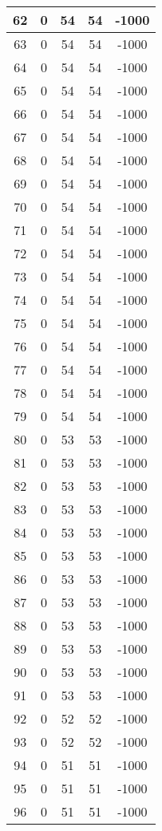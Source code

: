 \documentclass[letterpaper, 12pt]{article}
\begin{document}
\begin{longtable}{|c|c|c|c|c|}
\hline
62 & 0 & 54 & 54 & -1000 \\
\hline
63 & 0 & 54 & 54 & -1000 \\
\hline
64 & 0 & 54 & 54 & -1000 \\
\hline
65 & 0 & 54 & 54 & -1000 \\
\hline
66 & 0 & 54 & 54 & -1000 \\
\hline
67 & 0 & 54 & 54 & -1000 \\
\hline
68 & 0 & 54 & 54 & -1000 \\
\hline
69 & 0 & 54 & 54 & -1000 \\
\hline
70 & 0 & 54 & 54 & -1000 \\
\hline
71 & 0 & 54 & 54 & -1000 \\
\hline
72 & 0 & 54 & 54 & -1000 \\
\hline
73 & 0 & 54 & 54 & -1000 \\
\hline
74 & 0 & 54 & 54 & -1000 \\
\hline
75 & 0 & 54 & 54 & -1000 \\
\hline
76 & 0 & 54 & 54 & -1000 \\
\hline
77 & 0 & 54 & 54 & -1000 \\
\hline
78 & 0 & 54 & 54 & -1000 \\
\hline
79 & 0 & 54 & 54 & -1000 \\
\hline
80 & 0 & 53 & 53 & -1000 \\
\hline
81 & 0 & 53 & 53 & -1000 \\
\hline
82 & 0 & 53 & 53 & -1000 \\
\hline
83 & 0 & 53 & 53 & -1000 \\
\hline
84 & 0 & 53 & 53 & -1000 \\
\hline
85 & 0 & 53 & 53 & -1000 \\
\hline
86 & 0 & 53 & 53 & -1000 \\
\hline
87 & 0 & 53 & 53 & -1000 \\
\hline
88 & 0 & 53 & 53 & -1000 \\
\hline
89 & 0 & 53 & 53 & -1000 \\
\hline
90 & 0 & 53 & 53 & -1000 \\
\hline
91 & 0 & 53 & 53 & -1000 \\
\hline
92 & 0 & 52 & 52 & -1000 \\
\hline
93 & 0 & 52 & 52 & -1000 \\
\hline
94 & 0 & 51 & 51 & -1000 \\
\hline
95 & 0 & 51 & 51 & -1000 \\
\hline
96 & 0 & 51 & 51 & -1000 \\

\end{longtable}
\end{document}
